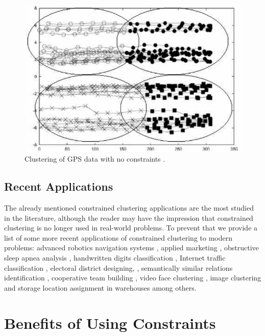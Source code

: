 \begin{figure}[!h]
	\centering
	\includegraphics[scale=0.32]{gfx/ConstClust/GPS/Instancias} 
	\caption[Clustering of GPS data with no constraints.]{Clustering of \acs{GPS} data with no constraints \cite{davidson2007survey,wagstaff2001constrained}.}\label{fig:figure15}
\end{figure}

\subsection{Recent Applications}

The already mentioned constrained clustering applications are the most studied in the literature, although the reader may have the impression that constrained clustering is no longer used in real-world problems. To prevent that we provide a list of some more recent applications of constrained clustering to modern problems: advanced robotics navigation systems \cite{semnani2016constrained}, applied marketing \cite{seret2014new}, obstructive sleep apnea analysis \cite{mai2018evolutionary}, handwritten digits classification \cite{li2015scalable}, Internet traffic classification \cite{wang2014internet}, electoral district designing, \cite{brieden2017constrained}, semantically similar relations identification \cite{wang2015constrained}, cooperative team building \cite{yang2014team}, video face clustering \cite{zhou2014video}, image clustering \cite{habashi2017semi} and storage location assignment in warehouses \cite{yang2016constrained} among others.

\section{Benefits of Using Constraints}

